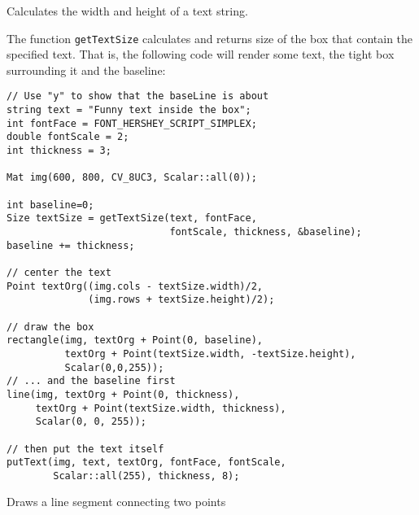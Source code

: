 Calculates the width and height of a text string.

\begin{description}
\end{description}

The function \texttt{getTextSize} calculates and returns size of the box that contain the specified text.
That is, the following code will render some text, the tight box surrounding it and the baseline:

\begin{lstlisting}
// Use "y" to show that the baseLine is about
string text = "Funny text inside the box";
int fontFace = FONT_HERSHEY_SCRIPT_SIMPLEX;
double fontScale = 2;
int thickness = 3;

Mat img(600, 800, CV_8UC3, Scalar::all(0));

int baseline=0;
Size textSize = getTextSize(text, fontFace,
                            fontScale, thickness, &baseline);
baseline += thickness;

// center the text
Point textOrg((img.cols - textSize.width)/2,
              (img.rows + textSize.height)/2);

// draw the box
rectangle(img, textOrg + Point(0, baseline),
          textOrg + Point(textSize.width, -textSize.height),
          Scalar(0,0,255));
// ... and the baseline first
line(img, textOrg + Point(0, thickness),
     textOrg + Point(textSize.width, thickness),
     Scalar(0, 0, 255));

// then put the text itself
putText(img, text, textOrg, fontFace, fontScale,
        Scalar::all(255), thickness, 8);
\end{lstlisting}
        
        
Draws a line segment connecting two points

